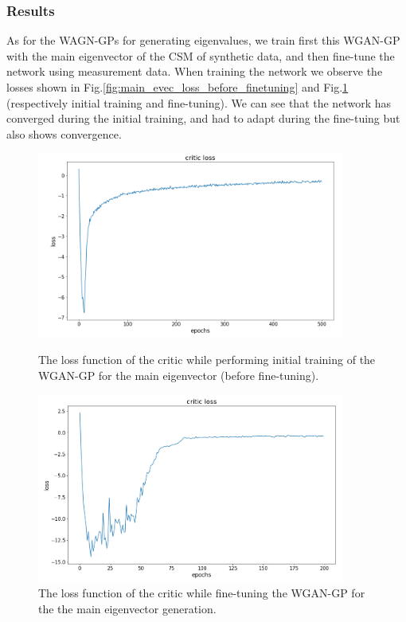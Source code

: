 \documentclass{article}
\begin{document}
\subsubsection{Results}

As for the WAGN-GPs for generating eigenvalues, we train first this WGAN-GP with the main eigenvector of the CSM of synthetic data, and then fine-tune the network using measurement data. When training the network we observe the losses shown in Fig.\ref{fig:main_evec_loss_before_finetuning} and Fig.\ref{fig:main_evec_loss_after_finetuning} (respectively initial training and fine-tuning). We can see that the network has converged during the initial training, and had to adapt during the fine-tuing but also shows convergence.

\begin{figure}
    \centering
    \begin{minipage}{0.45\textwidth}
        \includegraphics[width=0.9\textwidth]{../figs/main_evec_loss_before_finetuning.png}    
    \caption{The loss function of the critic while performing initial training of the WGAN-GP for the main eigenvector (before fine-tuning).}
    \label{fig:main_evec_loss_before_finetuning}
    \end{minipage}\hfill
    \begin{minipage}{0.45\textwidth}
        \includegraphics[width=0.9\textwidth]{../figs/main_evec_loss_after_finetuning.png}    
    \caption{The loss function of the critic while fine-tuning the WGAN-GP for the the main eigenvector generation.}
    \label{fig:main_evec_loss_after_finetuning}
    \end{minipage}
\end{figure}
\end{document}
